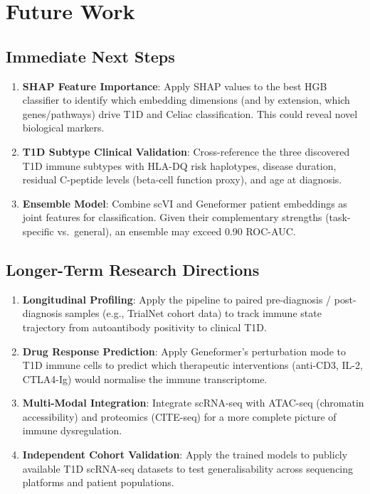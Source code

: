 \section{Future Work}

\subsection{Immediate Next Steps}

\begin{enumerate}
    \item \textbf{SHAP Feature Importance}: Apply SHAP values to the best HGB classifier to identify which embedding dimensions (and by extension, which genes/pathways) drive T1D and Celiac classification. This could reveal novel biological markers.

    \item \textbf{T1D Subtype Clinical Validation}: Cross-reference the three discovered T1D immune subtypes with HLA-DQ risk haplotypes, disease duration, residual C-peptide levels (beta-cell function proxy), and age at diagnosis.

    \item \textbf{Ensemble Model}: Combine scVI and Geneformer patient embeddings as joint features for classification. Given their complementary strengths (task-specific vs.\ general), an ensemble may exceed 0.90 ROC-AUC.
\end{enumerate}

\subsection{Longer-Term Research Directions}

\begin{enumerate}
    \item \textbf{Longitudinal Profiling}: Apply the pipeline to paired pre-diagnosis / post-diagnosis samples (e.g., TrialNet cohort data) to track immune state trajectory from autoantibody positivity to clinical T1D.

    \item \textbf{Drug Response Prediction}: Apply Geneformer's perturbation mode to T1D immune cells to predict which therapeutic interventions (anti-CD3, IL-2, CTLA4-Ig) would normalise the immune transcriptome.

    \item \textbf{Multi-Modal Integration}: Integrate scRNA-seq with ATAC-seq (chromatin accessibility) and proteomics (CITE-seq) for a more complete picture of immune dysregulation.

    \item \textbf{Independent Cohort Validation}: Apply the trained models to publicly available T1D scRNA-seq datasets to test generalisability across sequencing platforms and patient populations.
\end{enumerate}
